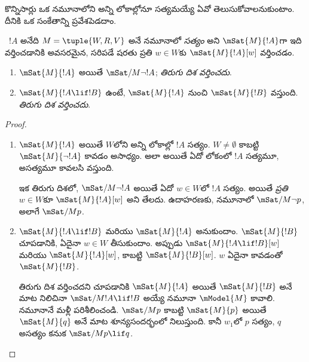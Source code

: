 \documentclass[../../../include/open-logic-section]{subfiles}
\begin{document}


కొన్నిసార్లు ఒక నమూనాలోని అన్ని లోకాల్లోనూ
సత్యమయ్యే  ఏవో తెలుసుకోవాలనుకుంటాం.
దీనికి ఒక సంకేతాన్ని ప్రవేశపెడదాం.

\begin{defn}
  ~$!A$ అనేది $M = \tuple{W, R,
    V}$ అనే నమూనాలో \emph{సత్యం} అని $\mSat{M}{!A}$గా
  ఇది వర్తించడానికి అవసరమైన, సరిపడే షరతు ప్రతి $w \in W$కు $\mSat{M}{!A}[w]$
  వర్తించడం.
\end{defn}

\begin{prop}
  \begin{enumerate}
  \item $\mSat{M}{!A}$ అయితే
    $\mSat/{M}{\lnot !A}$;
    \emph{తిరుగు దిశ వర్తించదు}.
  \item $\mSat{M}{!A \lif !B}$
    ఉంటే, $\mSat{M}{!A}$ నుంచి $\mSat{M}{!B}$ వస్తుంది.
    \emph{తిరుగు దిశ వర్తించదు}.
  \end{enumerate}
\end{prop}

\begin{proof}
  \begin{enumerate}
  \item $\mSat{M}{!A}$ అయితే
    $W$లోని అన్ని లోకాల్లో
    $!A$ సత్యం. $W \neq \emptyset$
    కాబట్టి $\mSat{M}{\lnot!A}$
    కావడం అసాధ్యం. అలా అయితే ఏదో
    లోకంలో $!A$ సత్యమూ,
    అసత్యమూ కావలసి వస్తుంది.

    ఇక తిరుగు దిశలో,
    $\mSat/{M}{\lnot !A}$
    అయితే ఏదో $w \in W$లో
    $!A$ సత్యం. అయితే
    \emph{ప్రతి}~$w \in W$కూ
    $\mSat{M}{!A}[w]$
    అని తేలదు. ఉదాహరణకు,
    నమూనాలో $\mSat/{M}{\lnot p}$,
    అలాగే $\mSat/{M}{p}$.
  \item $\mSat{M}{!A \lif !B}$
    మరియు $\mSat{M}{!A}$
    అనుకుందాం. $\mSat{M}{!B}$
    చూపడానికి, ఏదైనా
    $w \in W$ తీసుకుందాం.
    అప్పుడు $\mSat{M}{!A \lif !B}[w]$
    మరియు $\mSat{M}{!A}[w]$,
    కాబట్టి $\mSat{M}{!B}[w]$.
    $w$ ఏదైనా కావడంతో
    $\mSat{M}{!B}$.

    తిరుగు దిశ వర్తించదని
    చూపడానికి $\mSat{M}{!A}$
    అయితే $\mSat{M}{!B}$
    అనే మాట నిలిచినా
    $\mSat/{M}{!A \lif !B}$
    అయ్యే నమూనా
    $\mModel{M}$ కావాలి.
    నమూనానే మళ్లీ పరిశీలించండి.
    $\mSat/{M}{p}$ కాబట్టి
    $\mSat{M}{p}$ అయితే $\mSat{M}{q}$ అనే మాట
    శూన్యసందర్భంలో నిలుస్తుంది. కానీ
    $w_1$లో $p$ సత్యం,
    $q$ అసత్యం కనుక
    $\mSat/{M}{p \lif
      q}$.
  \end{enumerate}
\end{proof}
\end{document}

